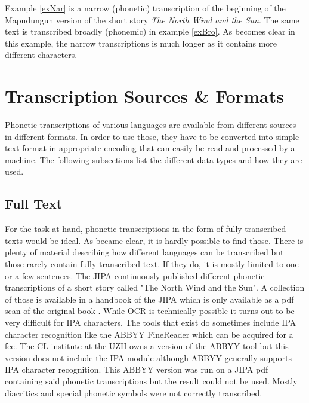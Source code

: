 \begin{covexamples}
\item \label{exNar} 
\item \label{exBro}
\end{covexamples}



Example \ref{exNar} is a narrow (phonetic) transcription of the beginning of the Mapudungun version of the short story \textit{The North Wind and the Sun}. The same text is transcribed broadly (phonemic) in example \ref{exBro}. As becomes clear in this example, the narrow transcriptions is much longer as it contains more different characters. 


\section{Transcription Sources \& Formats}
Phonetic transcriptions of various languages are available from different sources in different formats. In order to use those, they have to be converted into simple text format in appropriate encoding that can easily be read and processed by a machine. The following subsections list the different data types and how they are used.

\subsection{Full Text}
For the task at hand, phonetic transcriptions in the form of fully transcribed texts would be ideal. As became clear, it is hardly possible to find those. There is plenty of material describing how different languages can be transcribed but those rarely contain fully transcribed text. If they do, it is mostly limited to one or a few sentences. The JIPA continuously published different phonetic transcriptions of a short story called "The North Wind and the Sun". A collection of those is available in a handbook of the JIPA which is only available as a pdf scan of the original book \citep{JIPA2010}. While OCR is technically possible it turns out to be very difficult for IPA characters. The tools that exist do sometimes include IPA character recognition like the ABBYY FineReader which can be acquired for a fee. The CL institute at the UZH owns a version of the ABBYY tool but this version does not include the IPA module although ABBYY generally supports IPA character recognition. This ABBYY version was run on a JIPA pdf containing said phonetic transcriptions but the result could not be used. Mostly diacritics and special phonetic symbols were not correctly transcribed.

